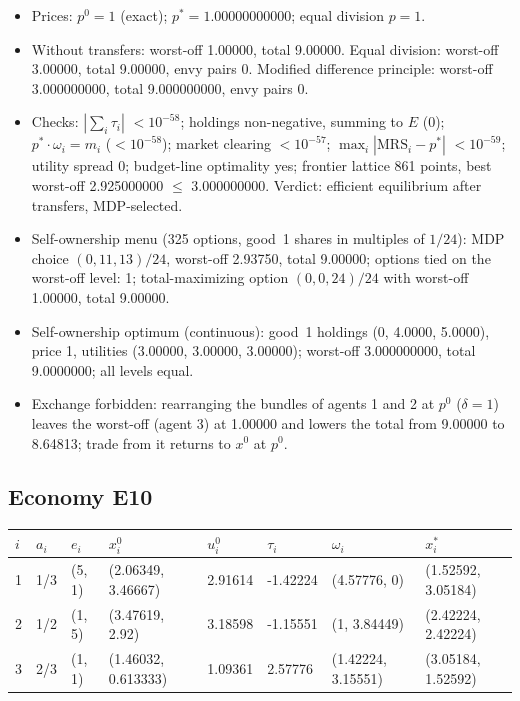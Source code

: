 \begin{itemize}[leftmargin=1.2em,itemsep=0pt,topsep=2pt]\footnotesize
\item Prices: $p^0 = 1$ (exact); $p^* = 1.00000000000$; equal division $p = 1$.
\item Without transfers: worst-off 1.00000, total 9.00000. Equal division: worst-off 3.00000, total 9.00000, envy pairs 0. Modified difference principle: worst-off 3.000000000, total 9.000000000, envy pairs 0.
\item Checks: $|\sum_i\tau_i|$ $<10^{-58}$; holdings non-negative, summing to $E$ (0); $p^*\cdot\omega_i = m_i$ ($<10^{-58}$); market clearing $<10^{-57}$; $\max_i|\mathrm{MRS}_i - p^*|$ $<10^{-59}$; utility spread 0; budget-line optimality yes; frontier lattice 861 points, best worst-off 2.925000000 $\leq$ 3.000000000. Verdict: efficient equilibrium after transfers, MDP-selected.
\item Self-ownership menu (325 options, good~1 shares in multiples of $1/24$): MDP choice $(0, 11, 13)/24$, worst-off 2.93750, total 9.00000; options tied on the worst-off level: 1; total-maximizing option $(0, 0, 24)/24$ with worst-off 1.00000, total 9.00000.
\item Self-ownership optimum (continuous): good~1 holdings (0, 4.0000, 5.0000), price 1, utilities (3.00000, 3.00000, 3.00000); worst-off 3.000000000, total 9.0000000; all levels equal.
\item Exchange forbidden: rearranging the bundles of agents 1 and 2 at $p^0$ ($\delta = 1$) leaves the worst-off (agent 3) at 1.00000 and lowers the total from 9.00000 to 8.64813; trade from it returns to $x^0$ at $p^0$.
\end{itemize}

\subsection*{Economy E10}
\label{ec:E10}
{\scriptsize\setlength{\tabcolsep}{3pt}
\begin{tabular}{@{}llllllll@{}}
\toprule
$i$ & $a_i$ & $e_i$ & $x^0_i$ & $u^0_i$ & $\tau_i$ & $\omega_i$ & $x^*_i$ \\
\midrule
1 & 1/3 & (5, 1) & (2.06349, 3.46667) & 2.91614 & -1.42224 & (4.57776, 0) & (1.52592, 3.05184) \\
2 & 1/2 & (1, 5) & (3.47619, 2.92) & 3.18598 & -1.15551 & (1, 3.84449) & (2.42224, 2.42224) \\
3 & 2/3 & (1, 1) & (1.46032, 0.613333) & 1.09361 & 2.57776 & (1.42224, 3.15551) & (3.05184, 1.52592) \\
\bottomrule\end{tabular}}

